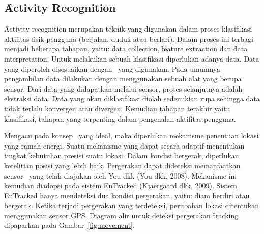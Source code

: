 \subsection{\f{Activity Recognition}}

\f{Activity recognition} merupakan teknik yang digunakan dalam proses
klasifikasi aktifitas fisik pengguna (berjalan, duduk atau berlari). Dalam
proses ini terbagi menjadi beberapa tahapan, yaitu: \f{data collection},
\f{feature extraction} dan \f{data interpretation}. Untuk melakukan sebuah
klasifikasi diperlukan adanya data.  Data yang diperoleh disesuaikan dengan
\context~yang digunakan. Pada umumnya pengambilan data dilakukan dengan
menggunakan sebuah alat yang berupa sensor. Dari data yang didapatkan melalui
sensor, proses selanjutnya adalah ekstraksi data. Data yang akan diklasifikasi
diolah sedemikian rupa sehingga data tidak terlalu konvergen atau divergen.
Kemudian tahapan terakhir yaitu klasifikasi, tahapan yang terpenting dalam
pengenalan aktifitas pengguna.

Mengacu pada konsep \tracking~yang ideal, maka diperlukan mekanisme penentuan
lokasi yang ramah energi. Suatu mekanisme yang dapat secara adaptif menentukan
tingkat kebutuhan presisi suatu lokasi. Dalam kondisi bergerak, diperlukan
ketelitian posisi yang lebih baik. Pergerakan dapat dideteksi memanfaatkan
sensor \acc~yang telah diajukan oleh You dkk (You dkk, 2008). Mekanisme ini
kemudian diadopsi pada sistem EnTracked (Kjaergaard dkk, 2009). Sistem
EnTracked hanya mendeteksi dua kondisi pergerakan, yaitu: diam berdiri atau
bergerak. Ketika terjadi pergerakan yang terdeteksi, perubahan lokasi
ditentukan menggunakan sensor GPS. Diagram alir untuk deteksi pergerakan
\f{tracking} dipaparkan pada Gambar~\ref{fig:movement}.

